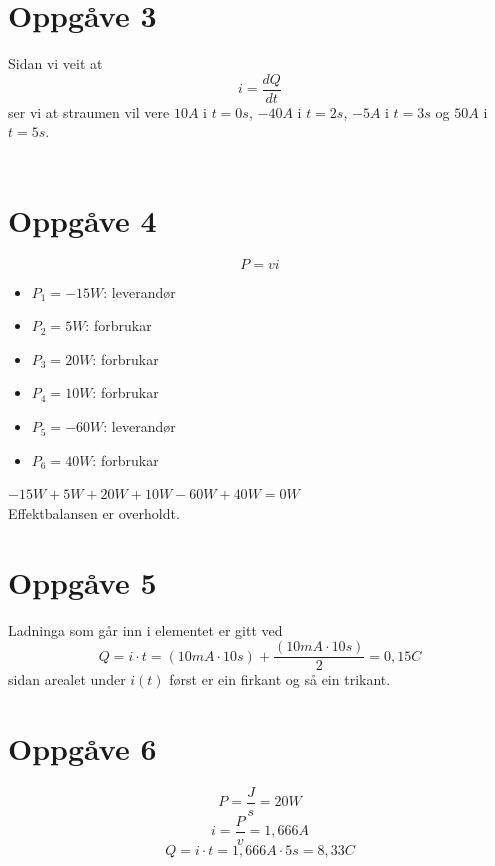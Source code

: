 \documentclass[12pt,a4paper]{article}
\begin{document}
	\section{Oppgåve 3}
		Sidan vi veit at
		\begin{equation}
			i = \frac{dQ}{dt}
		\end{equation}
		ser vi at straumen vil vere $10A$ i $t=0s$, $-40A$ i $t=2s$, $-5A$ i $t=3s$ og
		$50A$ i $t=5s$. \\ \\

	\newpage
	
	\section{Oppgåve 4}
		\begin{equation}
			P = vi
		\end{equation}
		\begin{itemize}
			\item $P_{1} = -15W$: leverandør
			\item $P_{2} = 5W$: forbrukar
			\item $P_{3} = 20W$: forbrukar
			\item $P_{4} = 10W$: forbrukar
			\item $P_{5} = -60W$: leverandør
			\item $P_{6} = 40W$: forbrukar
		\end{itemize}
		$-15W + 5W + 20W +10W - 60W + 40W = 0W$ \\
		Effektbalansen er overholdt.
	
	\section{Oppgåve 5}
		Ladninga som går inn i elementet er gitt ved
		\begin{equation}
			Q=i\cdot t = (10mA \cdot 10s) + \frac{(10mA \cdot 10s)}{2} = 0,15C
		\end{equation}
		sidan arealet under $i(t)$ først er ein firkant og så ein trikant.

	\section{Oppgåve 6}
		\begin{equation}
			P = \frac{J}{s} = 20W
		\end{equation}
		\begin{equation}
			i=\frac{P}{v}=1,666A
		\end{equation}
		\begin{equation}
			Q = i\cdot t = 1,666A \cdot 5s = 8,33C
		\end{equation}
\end{document}
